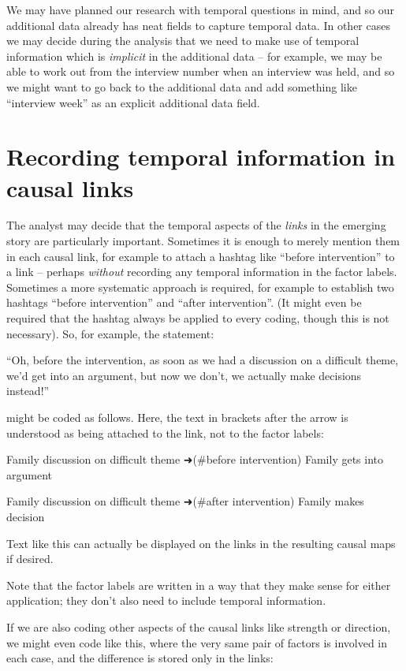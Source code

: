 \documentclass[
]{book}
\begin{document}
We may have planned our research with temporal questions in mind, and so our additional data already has neat fields to capture temporal data. In other cases we may decide during the analysis that we need to make use of temporal information which is \emph{implicit} in the additional data -- for example, we may be able to work out from the interview number when an interview was held, and so we might want to go back to the additional data and add something like ``interview week'' as an explicit additional data field.

\hypertarget{recording-temporal-information-in-causal-links}{%
\section{Recording temporal information in causal links}\label{recording-temporal-information-in-causal-links}}

The analyst may decide that the temporal aspects of the \emph{links} in the emerging story are particularly important. Sometimes it is enough to merely mention them in each causal link, for example to attach a hashtag like ``before intervention'' to a link -- perhaps \emph{without} recording any temporal information in the factor labels. Sometimes a more systematic approach is required, for example to establish two hashtags ``before intervention'' and ``after intervention''. (It might even be required that the hashtag always be applied to every coding, though this is not necessary). So, for example, the statement:

``Oh, before the intervention, as soon as we had a discussion on a difficult theme, we'd get into an argument, but now we don't, we actually make decisions instead!''

might be coded as follows. Here, the text in brackets after the arrow is understood as being attached to the link, not to the factor labels:

Family discussion on difficult theme ➜(\#before intervention) Family gets into argument

Family discussion on difficult theme ➜(\#after intervention) Family makes decision

Text like this can actually be displayed on the links in the resulting causal maps if desired.

Note that the factor labels are written in a way that they make sense for either application; they don't also need to include temporal information.

If we are also coding other aspects of the causal links like strength or direction, we might even code like this, where the very same pair of factors is involved in each case, and the difference is stored only in the links:
\end{document}
